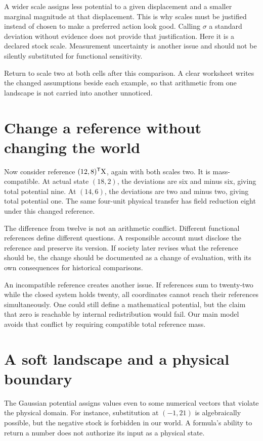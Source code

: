 A wider scale assigns less potential to a given displacement and a smaller marginal magnitude at that displacement. This is why scales must be justified instead of chosen to make a preferred action look good. Calling \(\sigma\) a standard deviation without evidence does not provide that justification. Here it is a declared stock scale. Measurement uncertainty is another issue and should not be silently substituted for functional sensitivity.

Return to scale two at both cells after this comparison. A clear worksheet writes the changed assumptions beside each example, so that arithmetic from one landscape is not carried into another unnoticed.

\section{Change a reference without changing the world}

Now consider reference \((12,8)^{\mathsf T}\mathrm{X}\), again with both scales two. It is mass-compatible. At actual state \((18,2)\), the deviations are six and minus six, giving total potential nine. At \((14,6)\), the deviations are two and minus two, giving total potential one. The same four-unit physical transfer has field reduction eight under this changed reference.

The difference from twelve is not an arithmetic conflict. Different functional references define different questions. A responsible account must disclose the reference and preserve its version. If society later revises what the reference should be, the change should be documented as a change of evaluation, with its own consequences for historical comparisons.

An incompatible reference creates another issue. If references sum to twenty-two while the closed system holds twenty, all coordinates cannot reach their references simultaneously. One could still define a mathematical potential, but the claim that zero is reachable by internal redistribution would fail. Our main model avoids that conflict by requiring compatible total reference mass.

\section{A soft landscape and a physical boundary}

The Gaussian potential assigns values even to some numerical vectors that violate the physical domain. For instance, substitution at \((-1,21)\) is algebraically possible, but the negative stock is forbidden in our world. A formula's ability to return a number does not authorize its input as a physical state.

